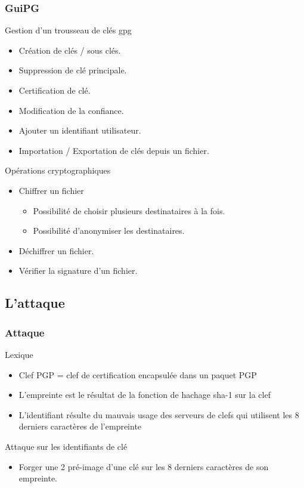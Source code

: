 \begin{frame}
  \frametitle{\color{white}GuiPG}
  \begin{block}{Gestion d'un trousseau de clés gpg}
      \begin{itemize}
        \item Création de clés / sous clés.
        \item Suppression de clé principale.
        \item Certification de clé.
        \item Modification de la confiance.
        \item Ajouter un identifiant utilisateur.
        \item Importation / Exportation de clés depuis un fichier.
      \end{itemize}
    \end{block}
    \begin{block}{Opérations cryptographiques}
      \begin{itemize}
        \item Chiffrer un fichier
	  \begin{itemize}
	   \item Possibilité de choisir plusieurs destinataires à la fois.
	   \item Possibilité d'anonymiser les destinataires.
	  \end{itemize}
        \item Déchiffrer un fichier.
        \item Vérifier la signature d'un fichier.
      \end{itemize}
    \end{block}
\end{frame}

\subsection{L'attaque}
\begin{frame}
  \frametitle{\color{white}Attaque}
  \begin{block}{Lexique}
    \begin{itemize}
      \item Clef PGP = clef de certification encapsulée dans un paquet PGP
      \item L'empreinte est le résultat de la fonction de hachage sha-1 sur la clef
      \item L'identifiant résulte du mauvais usage des serveurs de clefs qui utilisent les 8 derniers caractères de l'empreinte
    \end{itemize}
    \end{block}
  \begin{block}{Attaque sur les identifiants de clé}
    \begin{itemize}
      \item Forger une 2 pré-image d'une clé sur les 8 derniers caractères de son empreinte.
    \end{itemize}
  \end{block}
\end{frame}

